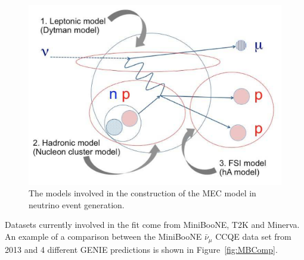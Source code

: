 \begin{figure}[h!]
    \centering
    \includegraphics[width=.6\textwidth]{images/mec_model_genie.png}
    \caption{The models involved in the construction of the MEC model in neutrino event generation.}
    \label{fig:MECSchem}
\end{figure}

Datasets currently involved in the fit come from MiniBooNE, T2K and Minerva. An example of a comparison between the MiniBooNE \(\bar{\nu}_{\mu}\) CCQE data set from 2013 and 4 different GENIE predictions is shown in Figure~\ref{fig:MBComp}.

